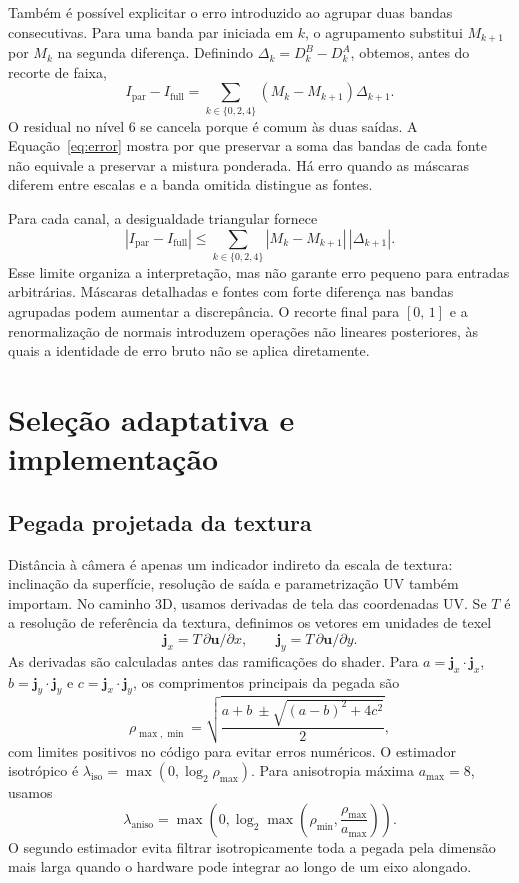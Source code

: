 Também é possível explicitar o erro introduzido ao agrupar duas bandas consecutivas. Para uma banda par iniciada em $k$, o agrupamento substitui $M_{k+1}$ por $M_k$ na segunda diferença. Definindo $\Delta_k=D^B_k-D^A_k$, obtemos, antes do recorte de faixa,
\begin{equation}
I_{\mathrm{par}}-I_{\mathrm{full}}
=\sum_{k\in\{0,2,4\}}(M_k-M_{k+1})\Delta_{k+1}.
\label{eq:error}
\end{equation}
O residual no nível 6 se cancela porque é comum às duas saídas. A Equação~\ref{eq:error} mostra por que preservar a soma das bandas de cada fonte não equivale a preservar a mistura ponderada. Há erro quando as máscaras diferem entre escalas e a banda omitida distingue as fontes.

Para cada canal, a desigualdade triangular fornece
\begin{equation}
|I_{\mathrm{par}}-I_{\mathrm{full}}|
\leq\sum_{k\in\{0,2,4\}}|M_k-M_{k+1}|\,|\Delta_{k+1}|.
\end{equation}
Esse limite organiza a interpretação, mas não garante erro pequeno para entradas arbitrárias. Máscaras detalhadas e fontes com forte diferença nas bandas agrupadas podem aumentar a discrepância. O recorte final para $[0,\,1]$ e a renormalização de normais introduzem operações não lineares posteriores, às quais a identidade de erro bruto não se aplica diretamente.

\section{Seleção adaptativa e implementação}
\subsection{Pegada projetada da textura}
Distância à câmera é apenas um indicador indireto da escala de textura: inclinação da superfície, resolução de saída e parametrização UV também importam. No caminho 3D, usamos derivadas de tela das coordenadas UV. Se $T$ é a resolução de referência da textura, definimos os vetores em unidades de texel
\begin{equation}
\mathbf{j}_x=T\,\partial\mathbf{u}/\partial x,\qquad
\mathbf{j}_y=T\,\partial\mathbf{u}/\partial y.
\end{equation}
As derivadas são calculadas antes das ramificações do shader. Para $a=\mathbf{j}_x\cdot\mathbf{j}_x$, $b=\mathbf{j}_y\cdot\mathbf{j}_y$ e $c=\mathbf{j}_x\cdot\mathbf{j}_y$, os comprimentos principais da pegada são
\begin{equation}
\rho_{\max,\min}=\sqrt{\frac{a+b\ \pm\sqrt{(a-b)^2+4c^2}}{2}},
\end{equation}
com limites positivos no código para evitar erros numéricos. O estimador isotrópico é $\lambda_{\mathrm{iso}}=\max(0,\log_2\rho_{\max})$. Para anisotropia máxima $a_{\max}=8$, usamos
\begin{equation}
\lambda_{\mathrm{aniso}}=\max\!\left(0,\log_2\max\left(\rho_{\min},\frac{\rho_{\max}}{a_{\max}}\right)\right).
\label{eq:aniso}
\end{equation}
O segundo estimador evita filtrar isotropicamente toda a pegada pela dimensão mais larga quando o hardware pode integrar ao longo de um eixo alongado.

